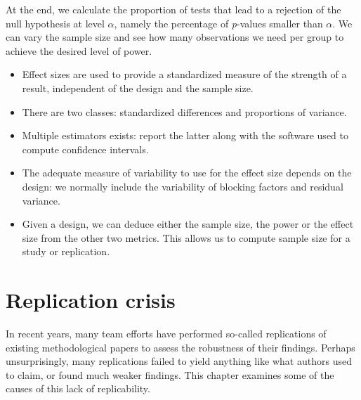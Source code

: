 \documentclass[
  11pt,
  letterpaper,
]{scrbook}
\providecommand{\tightlist}{%
  \setlength{\itemsep}{0pt}\setlength{\parskip}{0pt}}\usepackage{longtable,booktabs,array}
\theoremstyle{definition}
\theoremstyle{remark}
\begin{document}
At the end, we calculate the proportion of tests that lead to a
rejection of the null hypothesis at level \(\alpha\), namely the
percentage of \emph{p}-values smaller than \(\alpha\). We can vary the
sample size and see how many observations we need per group to achieve
the desired level of power.

\begin{tcolorbox}[enhanced jigsaw, title=\textcolor{quarto-callout-important-color}{\faExclamation}\hspace{0.5em}{\textbf{Summary}}, bottomtitle=1mm, opacitybacktitle=0.6, colframe=quarto-callout-important-color-frame, leftrule=.75mm, coltitle=black, colbacktitle=quarto-callout-important-color!10!white, colback=white, toprule=.15mm, rightrule=.15mm, breakable, bottomrule=.15mm, opacityback=0, toptitle=1mm, titlerule=0mm, arc=.35mm, left=2mm]

\begin{itemize}
\tightlist
\item
  Effect sizes are used to provide a standardized measure of the
  strength of a result, independent of the design and the sample size.
\item
  There are two classes: standardized differences and proportions of
  variance.
\item
  Multiple estimators exists: report the latter along with the software
  used to compute confidence intervals.
\item
  The adequate measure of variability to use for the effect size depends
  on the design: we normally include the variability of blocking factors
  and residual variance.
\item
  Given a design, we can deduce either the sample size, the power or the
  effect size from the other two metrics. This allows us to compute
  sample size for a study or replication.
\end{itemize}

\end{tcolorbox}


\hypertarget{replication-crisis}{%
\chapter{Replication crisis}\label{replication-crisis}}

In recent years, many team efforts have performed so-called replications
of existing methodological papers to assess the robustness of their
findings. Perhaps unsurprisingly, many replications failed to yield
anything like what authors used to claim, or found much weaker findings.
This chapter examines some of the causes of this lack of replicability.
\end{document}
